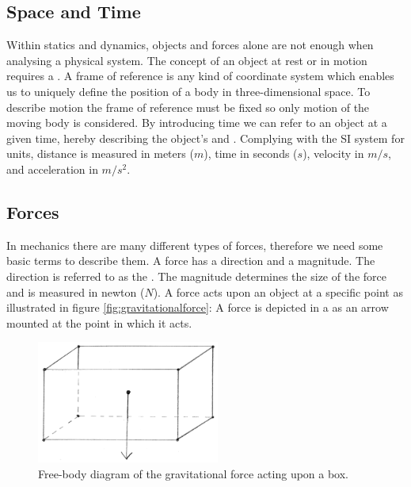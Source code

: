 \subsection{Space and Time}
Within statics and dynamics, objects and forces alone are not enough
when analysing a physical system. The concept of an object at
rest or in motion requires a . A frame of
reference is any kind of coordinate system which enables us to uniquely
define the position of a body in three-dimensional space. To
describe motion the frame of reference must be fixed so only motion of
the moving body is considered.
%
By introducing time we can refer to an object at a given
time, hereby describing the object's 
and .
%
Complying with the SI system for units, distance is measured in meters
($m$), time in seconds ($s$), velocity in $m/s$, and acceleration in
$m/s^2$.

\subsection{Forces}
In mechanics there are many different types of forces,
therefore we need some basic terms to describe them. A force has a
direction and a magnitude. The direction is referred to as the
. The magnitude determines the size of the
force and is measured in newton ($N$). A force acts upon an object at
a specific point as illustrated in figure
\vref{fig:gravitationalforce}: A force is depicted in a
 as an arrow mounted at the point in which it
acts.

\begin{figure}
  \centering
  \includegraphics[width=6cm]{./images/physics_gravitationalforce.png}
\caption{Free-body diagram of the gravitational force acting upon a box.}
\label{fig:gravitationalforce}
\end{figure}

